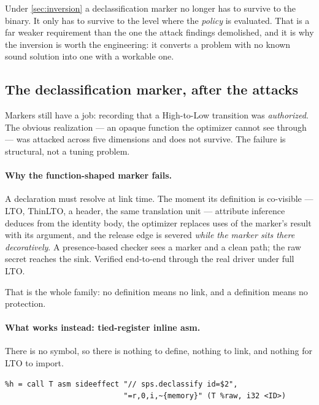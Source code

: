\begin{remark}
Under \cref{sec:inversion} a declassification marker no longer has to survive to
the binary. It only has to survive to the level where the \emph{policy} is
evaluated. That is a far weaker requirement than the one the attack findings
demolished, and it is why the inversion is worth the engineering: it converts a
problem with no known sound solution into one with a workable one.
\end{remark}

\subsection{The declassification marker, after the attacks}
\label{sec:marker}

Markers still have a job: recording that a High-to-Low transition was
\emph{authorized}. The obvious realization --- an opaque function the optimizer
cannot see through --- was attacked across five dimensions and does not survive.
The failure is structural, not a tuning problem.

\paragraph{Why the function-shaped marker fails.} A declaration must resolve at
link time. The moment its definition is co-visible --- LTO, ThinLTO, a header,
the same translation unit --- attribute inference deduces  from
the identity body, the optimizer replaces uses of the marker's result with its
argument, and the release edge is severed \emph{while the marker sits there
decoratively}. A presence-based checker sees a marker and a clean path; the raw
secret reaches the sink. Verified end-to-end through the real  driver
under full LTO.

That is the whole family: no definition means no link, and a definition means no
protection.

\paragraph{What works instead: tied-register inline asm.} There is no symbol, so
there is nothing to define, nothing to link, and nothing for LTO to import.

\begin{center}
\begin{minipage}{0.92\linewidth}
\small
\begin{verbatim}
%h = call T asm sideeffect "// sps.declassify id=$2",
                           "=r,0,i,~{memory}" (T %raw, i32 <ID>)
\end{verbatim}
\end{minipage}
\end{center}

